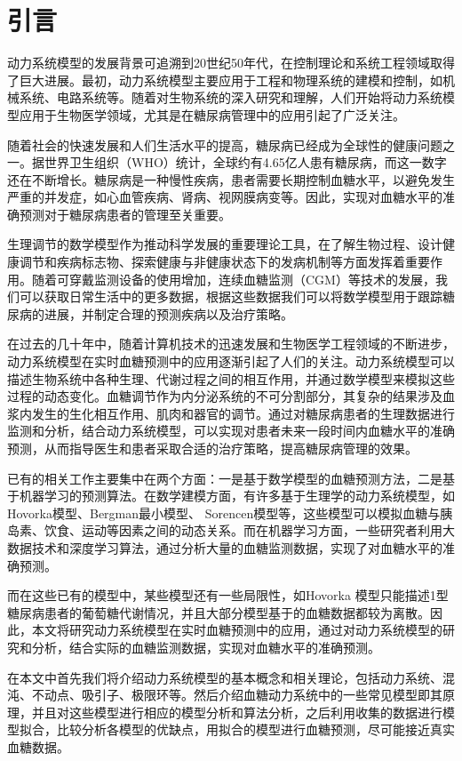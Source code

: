 \chapter{引言}\label{chap:introduction}
动力系统模型的发展背景可追溯到20世纪50年代，在控制理论和系统工程领域取得了巨大进展。最初，动力系统模型主要应用于工程和物理系统的建模和控制，如机械系统、电路系统等\cite{hargrove1998dynamic}。随着对生物系统的深入研究和理解，人们开始将动力系统模型应用于生物医学领域，尤其是在糖尿病管理中的应用引起了广泛关注\cite{ellner2006dynamic}。

随着社会的快速发展和人们生活水平的提高，糖尿病已经成为全球性的健康问题之一。据世界卫生组织（WHO）统计，全球约有4.65亿人患有糖尿病，而这一数字还在不断增长\cite{zimmet2016diabetes}。糖尿病是一种慢性疾病，患者需要长期控制血糖水平，以避免发生严重的并发症，如心血管疾病、肾病、视网膜病变等\cite{zheng2018global}。因此，实现对血糖水平的准确预测对于糖尿病患者的管理至关重要。

生理调节的数学模型作为推动科学发展的重要理论工具，在了解生物过程、设计健康调节和疾病标志物、探索健康与非健康状态下的发病机制等方面发挥着重要作用\cite{bakhti2019modelling}。随着可穿戴监测设备的使用增加\cite{kim2020wearable}，连续血糖监测（CGM）等技术的发展，我们可以获取日常生活中的更多数据，根据这些数据我们可以将数学模型用于跟踪糖尿病的进展\cite{ha2020type}，并制定合理的预测疾病以及治疗策略。

在过去的几十年中，随着计算机技术的迅速发展和生物医学工程领域的不断进步，动力系统模型在实时血糖预测中的应用逐渐引起了人们的关注。动力系统模型可以描述生物系统中各种生理、代谢过程之间的相互作用，并通过数学模型来模拟这些过程的动态变化\cite{cobelli2009diabetes}。血糖调节作为内分泌系统的不可分割部分，其复杂的结果涉及血浆内发生的生化相互作用、肌肉和器官的调节\cite{zavala2019mathematical}。通过对糖尿病患者的生理数据进行监测和分析，结合动力系统模型，可以实现对患者未来一段时间内血糖水平的准确预测，从而指导医生和患者采取合适的治疗策略，提高糖尿病管理的效果。

已有的相关工作主要集中在两个方面：一是基于数学模型的血糖预测方法，二是基于机器学习的预测算法。在数学建模方面，有许多基于生理学的动力系统模型，如Hovorka模型、Bergman最小模型、 Sorencen模型等\cite{pompa2021comparison,mari2001model,de2000mathematical}，这些模型可以模拟血糖与胰岛素、饮食、运动等因素之间的动态关系。而在机器学习方面，一些研究者利用大数据技术和深度学习算法，通过分析大量的血糖监测数据，实现了对血糖水平的准确预测。

而在这些已有的模型中，某些模型还有一些局限性，如Hovorka 模型只能描述1型糖尿病患者的葡萄糖代谢情况，并且大部分模型基于的血糖数据都较为离散。因此，本文将研究动力系统模型在实时血糖预测中的应用，通过对动力系统模型的研究和分析，结合实际的血糖监测数据，实现对血糖水平的准确预测。

在本文中首先我们将介绍动力系统模型的基本概念和相关理论，包括动力系统、混沌、不动点、吸引子、极限环等。然后介绍血糖动力系统中的一些常见模型即其原理，并且对这些模型进行相应的模型分析和算法分析，之后利用收集的数据进行模型拟合，比较分析各模型的优缺点，用拟合的模型进行血糖预测，尽可能接近真实血糖数据。